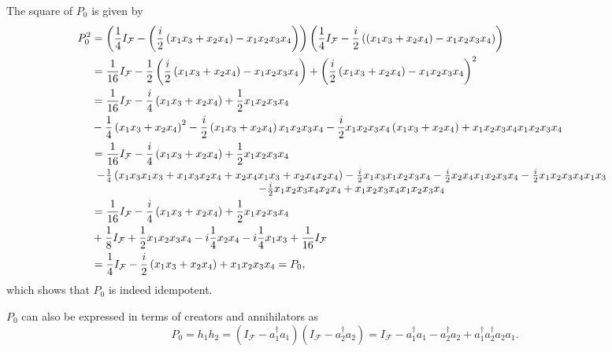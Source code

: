 \documentclass[aps,preprint]{revtex4}%
\begin{document}
The square of $P_{0}$ is given by
\begin{align}
P_{0}^{2}  &  =\left(  \frac{1}{4}I_{\mathcal{F}}-\left(  \frac{i}{2}\left(
x_{1}x_{3}+x_{2}x_{4}\right)  -x_{1}x_{2}x_{3}x_{4}\right)  \right)  \left(
\frac{1}{4}I_{\mathcal{F}}-\frac{i}{2}\left(  \left(  x_{1}x_{3}+x_{2}%
x_{4}\right)  -x_{1}x_{2}x_{3}x_{4}\right)  \right) \\
&  =\frac{1}{16}I_{\mathcal{F}}-\frac{1}{2}\left(  \frac{i}{2}\left(
x_{1}x_{3}+x_{2}x_{4}\right)  -x_{1}x_{2}x_{3}x_{4}\right)  +\left(  \frac
{i}{2}\left(  x_{1}x_{3}+x_{2}x_{4}\right)  -x_{1}x_{2}x_{3}x_{4}\right)
^{2}\\
&  =\frac{1}{16}I_{\mathcal{F}}-\frac{i}{4}\left(  x_{1}x_{3}+x_{2}%
x_{4}\right)  +\frac{1}{2}x_{1}x_{2}x_{3}x_{4}\\
&  -\frac{1}{4}\left(  x_{1}x_{3}+x_{2}x_{4}\right)  ^{2}-\frac{i}{2}\left(
x_{1}x_{3}+x_{2}x_{4}\right)  x_{1}x_{2}x_{3}x_{4}-\frac{i}{2}x_{1}x_{2}%
x_{3}x_{4}\left(  x_{1}x_{3}+x_{2}x_{4}\right)  +x_{1}x_{2}x_{3}x_{4}%
x_{1}x_{2}x_{3}x_{4}\\
&  =\frac{1}{16}I_{\mathcal{F}}-\frac{i}{4}\left(  x_{1}x_{3}+x_{2}%
x_{4}\right)  +\frac{1}{2}x_{1}x_{2}x_{3}x_{4}\\
&
\begin{array}
[c]{c}%
-\frac{1}{4}\left(  x_{1}x_{3}x_{1}x_{3}+x_{1}x_{3}x_{2}x_{4}+x_{2}x_{4}%
x_{1}x_{3}+x_{2}x_{4}x_{2}x_{4}\right)  -\frac{i}{2}x_{1}x_{3}x_{1}x_{2}%
x_{3}x_{4}-\frac{i}{2}x_{2}x_{4}x_{1}x_{2}x_{3}x_{4}-\frac{i}{2}x_{1}%
x_{2}x_{3}x_{4}x_{1}x_{3}\\
-\frac{i}{2}x_{1}x_{2}x_{3}x_{4}x_{2}x_{4}+x_{1}x_{2}x_{3}x_{4}x_{1}x_{2}%
x_{3}x_{4}%
\end{array}
\\
&  =\frac{1}{16}I_{\mathcal{F}}-\frac{i}{4}\left(  x_{1}x_{3}+x_{2}%
x_{4}\right)  +\frac{1}{2}x_{1}x_{2}x_{3}x_{4}\\
&  +\frac{1}{8}I_{\mathcal{F}}+\frac{1}{2}x_{1}x_{2}x_{3}x_{4}-i\frac{1}%
{4}x_{2}x_{4}-i\frac{1}{4}x_{1}x_{3}+\frac{1}{16}I_{\mathcal{F}}\\
&  =\frac{1}{4}I_{\mathcal{F}}-\frac{i}{2}\left(  x_{1}x_{3}+x_{2}%
x_{4}\right)  +x_{1}x_{2}x_{3}x_{4}=P_{0},
\end{align}
which shows that $P_{0}$ is indeed idempotent.

$P_{0}$ can also be expressed in terms of creators and annihilators as
\begin{equation}
P_{0}=h_{1}h_{2}=\left(  I_{\mathcal{F}}-a_{1}^{\dagger}a_{1}\right)  \left(
I_{\mathcal{F}}-a_{2}^{\dagger}a_{2}\right)  =I_{\mathcal{F}}-a_{1}^{\dagger
}a_{1}-a_{2}^{\dagger}a_{2}+a_{1}^{\dagger}a_{2}^{\dagger}a_{2}a_{1}.
\end{equation}
\end{document}
